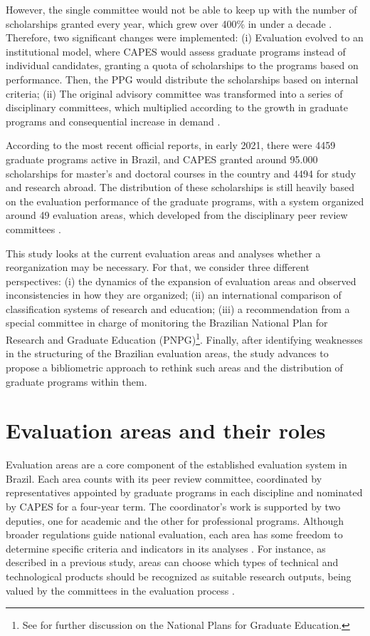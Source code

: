 However, the single committee would not be able to keep up with the number of scholarships granted every year, which grew over 400\% in under a decade \autocite{Castro.1983}. Therefore, two significant changes were implemented: (i) Evaluation evolved to an institutional model, where CAPES would assess graduate programs instead of individual candidates, granting a quota of scholarships to the programs based on performance. Then, the PPG would distribute the scholarships based on internal criteria; (ii) The original advisory committee was transformed into a series of disciplinary committees, which multiplied according to the growth in graduate programs and consequential increase in demand \autocite{Cordova.2001, Ferreira.2002}.

According to the most recent official reports, in early 2021, there were 4459 graduate programs active in Brazil, and CAPES granted around 95.000 scholarships for master's and doctoral courses in the country and 4494 for study and research abroad. The distribution of these scholarships is still heavily based on the evaluation performance of the graduate programs, with a system organized around 49 evaluation areas, which developed from the disciplinary peer review committees \autocite{CAPES.2020tb, CAPES.2021g}.

This study looks at the current evaluation areas and analyses whether a reorganization may be necessary. For that, we consider three different perspectives: (i) the dynamics of the expansion of evaluation areas and observed inconsistencies in how they are organized; (ii) an international comparison of classification systems of research and education; (iii) a recommendation from a special committee in charge of monitoring the Brazilian National Plan for Research and Graduate Education (PNPG)\footnote{See \textcite{Brasil.2020} for further discussion on the National Plans for Graduate Education.}. Finally, after identifying weaknesses in the structuring of the Brazilian evaluation areas, the study advances to propose a bibliometric approach to rethink such areas and the distribution of graduate programs within them.

\section{Evaluation areas and their roles}
\label{sec:classif:eval_areas}

Evaluation areas are a core component of the established evaluation system in Brazil. Each area counts with its peer review committee, coordinated by representatives appointed by graduate programs in each discipline and nominated by CAPES for a four-year term. The coordinator's work is supported by two deputies, one for academic and the other for professional programs. Although broader regulations guide national evaluation, each area has some freedom to determine specific criteria and indicators in its analyses \autocite{141/2016}. For instance, as described in a previous study, areas can choose which types of technical and technological products should be recognized as suitable research outputs, being valued by the committees in the evaluation process \autocite{Brasil.2021a}.

